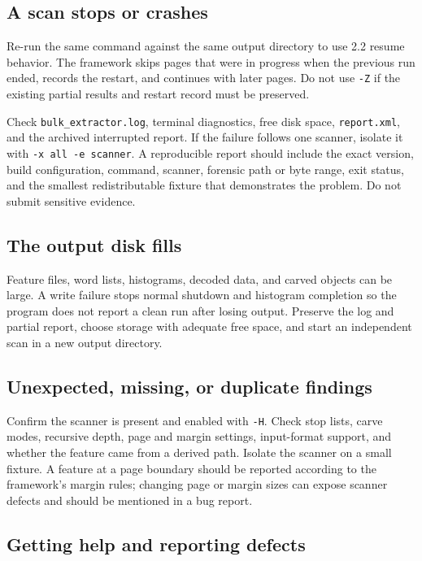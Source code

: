 \documentclass[11pt]{article}
\newcommand{\code}[1]{\texttt{#1}}
\begin{document}
\subsection{A scan stops or crashes}

Re-run the same command against the same output directory to use 2.2 resume
behavior. The framework skips pages that were in progress when the previous
run ended, records the restart, and continues with later pages. Do not use
\code{-Z} if the existing partial results and restart record must be preserved.

Check \code{bulk\_extractor.log}, terminal diagnostics, free disk space,
\code{report.xml}, and the archived interrupted report. If the failure follows
one scanner, isolate it with \code{-x all -e scanner}. A reproducible report
should include the exact version, build configuration, command, scanner,
forensic path or byte range, exit status, and the smallest redistributable
fixture that demonstrates the problem. Do not submit sensitive evidence.

\subsection{The output disk fills}

Feature files, word lists, histograms, decoded data, and carved objects can be
large. A write failure stops normal shutdown and histogram completion so the
program does not report a clean run after losing output. Preserve the log and
partial report, choose storage with adequate free space, and start an
independent scan in a new output directory.

\subsection{Unexpected, missing, or duplicate findings}

Confirm the scanner is present and enabled with \code{-H}. Check stop lists,
carve modes, recursive depth, page and margin settings, input-format support,
and whether the feature came from a derived path. Isolate the scanner on a
small fixture. A feature at a page boundary should be reported according to the
framework's margin rules; changing page or margin sizes can expose scanner
defects and should be mentioned in a bug report.

\subsection{Getting help and reporting defects}
\end{document}
